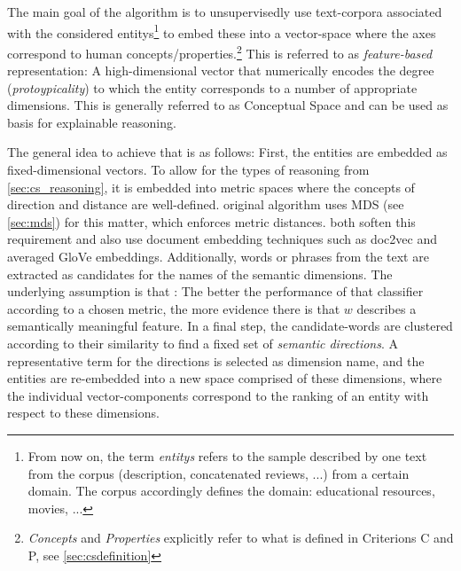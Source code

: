 
The main goal of the algorithm is to unsupervisedly use text-corpora associated with the considered \glspl{entity}\footnote{From now on, the term \textit{\glspl{entity}} refers to the sample described by one text from the corpus (description, concatenated reviews, ...) from a certain domain. The corpus accordingly defines the domain: educational resources, movies, ...} to embed these into a vector-space where the axes correspond to human concepts/properties.\footnote{\textit{Concepts} and \textit{Properties} explicitly refer to what is defined in Criterions C and P, see \ref{sec:csdefinition}} This is referred to as \textit{feature-based} representation: A high-dimensional vector that numerically encodes the degree (\textit{protoypicality}) to which the entity corresponds to a number of appropriate dimensions. This is generally referred to as Conceptual Space and can be used as basis for explainable reasoning.

The general idea to achieve that is as follows: First, the entities are embedded as fixed-dimensional vectors. To allow for the types of reasoning from \autoref{sec:cs_reasoning}, it is embedded into metric spaces where the concepts of direction and distance are well-defined.  original algorithm uses MDS (see \ref{sec:mds}) for this matter, which enforces metric distances. \cite{Ager2018,Alshaikh2020} both soften this requirement and also use document embedding techniques such as \gls{doc2vec} and averaged GloVe \cite{pennington2014glove} embeddings. Additionally, words or phrases from the text are extracted as candidates for the names of the semantic dimensions. The underlying assumption is that  \cite[3574]{Alshaikh2020}: The better the performance of that classifier according to a chosen metric, the more evidence there is that $w$ describes a semantically meaningful feature. 
In a final step, the candidate-words are clustered according to their similarity to find a fixed set of \emph{semantic directions}. A representative term for the directions is selected as dimension name, and the entities are re-embedded into a new space comprised of these dimensions, where the individual vector-components correspond to the ranking of an entity with respect to these dimensions.

